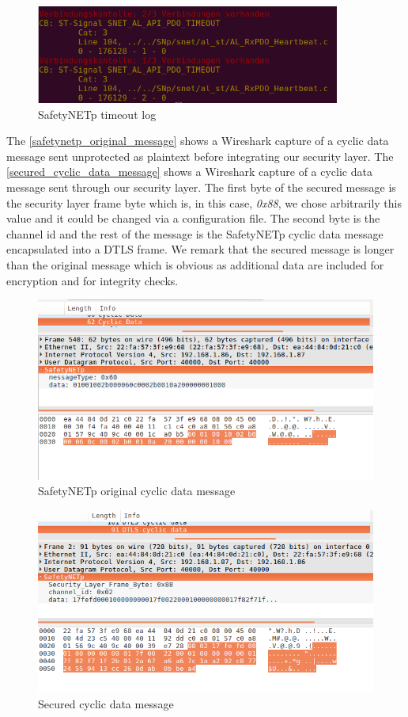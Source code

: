\begin{figure}[H]
\centering
\includegraphics[width=10cm]{figures/realization/cyclic_data_time_out.png}
\caption{SafetyNETp timeout log}\label{cyclic_data_time_out}
\end{figure}

The \autoref{safetynetp_original_message} shows a Wireshark capture of a cyclic data message sent unprotected as plaintext
before integrating our security
layer. The \autoref{secured_cyclic_data_message} shows a Wireshark capture of a cyclic data message sent through our security layer.
The first byte of the secured message is the security layer frame byte which is, in this case, \textit{0x88},
we chose arbitrarily this value and it could be changed via a configuration file. The second byte is the channel id
and the rest of the message is the SafetyNETp cyclic data message encapsulated into a DTLS frame.
We remark that the secured message is longer than the original message which is obvious as
additional data are included for encryption and for integrity checks.

\begin{figure}[H]
\centering
\includegraphics[width=12cm,frame]{figures/realization/unprotected_cyclic_data.png}
\caption{SafetyNETp original cyclic data message}\label{safetynetp_original_message}
\end{figure}

\begin{figure}[H]
\centering
\includegraphics[width=12cm,frame]{figures/realization/secured_cyclic_data.png}
\caption{Secured cyclic data message}\label{secured_cyclic_data_message}
\end{figure}

